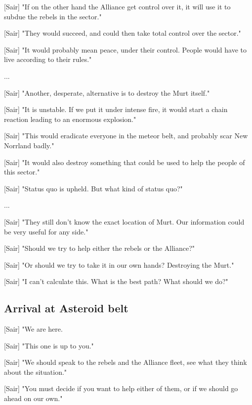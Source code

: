 \documentclass[a4paper,12pt]{article}
\begin{document}
[Sair] "If on the other hand the Alliance get control over it, it will use it to subdue the rebels in the sector."

[Sair] "They would succeed, and could then take total control over the sector." 

[Sair] "It would probably mean peace, under their control. People would have to live according to their rules."

...

[Sair] "Another, desperate, alternative is to destroy the Murt itself."

[Sair] "It is unstable. If we put it under intense fire, 
it would start a chain reaction leading to an enormous explosion."

[Sair] "This would eradicate everyone in the meteor belt, and probably scar New Norrland badly."

[Sair] "It would also destroy something that could be used to help the people of this sector."

[Sair] "Status quo is upheld. But what kind of status quo?"

...

[Sair] "They still don't know the exact location of Murt. Our information could be very
useful for any side."

[Sair] "Should we try to help either the rebels or the Alliance?"

[Sair] "Or should we try to take it in our own hands? Destroying the Murt."

[Sair] "I can't calculate this. What is the best path? What should we do?"


\subsection{Arrival at Asteroid belt}

[Sair] "We are here. 

[Sair] "This one is up to you." 

[Sair] "We should speak to the rebels and the Alliance fleet, see what they think about the
situation."

[Sair] "You must decide if you want to help either of them, or if we should go ahead on our own."
\end{document}
